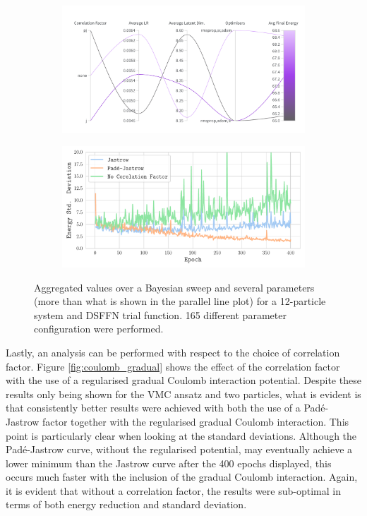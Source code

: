 \begin{figure}[H]
    \centering
    \begin{subfigure}{0.84\textwidth}
        \centering
        \includegraphics[width=\textwidth]{Chapters/Results/dots/n12_agg_corr.png}
    \end{subfigure}
    \begin{subfigure}{0.8\textwidth}
        \centering
        \includegraphics[width=\textwidth]{Chapters/Results/dots/correlation_factorsN_n12.pdf}
    \end{subfigure}
    \caption{Aggregated values over a Bayesian sweep and several parameters (more than what is shown in the parallel line plot) for a 12-particle system and DSFFN trial function. 165 different parameter configuration were performed.}
    \label{fig:corre_std}
\end{figure}

Lastly, an analysis can be performed with respect to the choice of correlation factor. Figure \ref{fig:coulomb_gradual} shows the effect of the correlation factor with the use of a regularised gradual Coulomb interaction potential. Despite these results only being shown for the VMC ansatz and two particles, what is evident is that consistently better results were achieved with both the use of a Padé-Jastrow factor together with the regularised gradual Coulomb interaction. This point is particularly clear when looking at the standard deviations. Although the Padé-Jastrow curve, without the regularised potential, may eventually achieve a lower minimum than the Jastrow curve after the 400 epochs displayed, this occurs much faster with the inclusion of the gradual Coulomb interaction. Again, it is evident that without a correlation factor, the results were sub-optimal in terms of both energy reduction and standard deviation.

